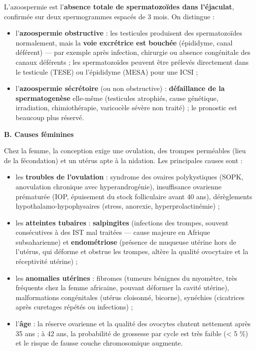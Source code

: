 \documentclass[11pt]{article}
\newcommand{\cle}[1]{{\popxbold\color{popdark}#1}}
\begin{document}
\begin{definition}[Azoospermie]
L'\cle{azoospermie} est l'\textbf{absence totale de spermatozoïdes dans l'éjaculat}, confirmée sur deux spermogrammes espacés de 3 mois. On distingue :
\begin{itemize}
\item l'\textbf{azoospermie obstructive} : les testicules produisent des spermatozoïdes normalement, mais la \textbf{voie excrétrice est bouchée} (épididyme, canal déférent) — par exemple après infection, chirurgie ou absence congénitale des canaux déférents ; les spermatozoïdes peuvent être prélevés directement dans le testicule (TESE) ou l'épididyme (MESA) pour une ICSI ;
\item l'\textbf{azoospermie sécrétoire} (ou non obstructive) : \textbf{défaillance de la spermatogenèse} elle-même (testicules atrophiés, cause génétique, irradiation, chimiothérapie, varicocèle sévère non traité) ; le pronostic est beaucoup plus réservé.
\end{itemize}
\end{definition}

\textbf{B. Causes féminines}\par

Chez la femme, la conception exige une ovulation, des trompes perméables (lieu de la fécondation) et un utérus apte à la nidation. Les principales causes sont :

\begin{itemize}
\item les \textbf{troubles de l'ovulation} : syndrome des ovaires polykystiques (\cle{SOPK}, anovulation chronique avec hyperandrogénie), insuffisance ovarienne prématurée (\cle{IOP}, épuisement du stock folliculaire avant 40 ans), dérèglements hypothalamo-hypophysaires (stress, anorexie, hyperprolactinémie) ;
\item les \textbf{atteintes tubaires} : \textbf{salpingites} (infections des trompes, souvent consécutives à des IST mal traitées — cause majeure en Afrique subsaharienne) et \textbf{endométriose} (présence de muqueuse utérine hors de l'utérus, qui déforme et obstrue les trompes, altère la qualité ovocytaire et la réceptivité utérine) ;
\item les \textbf{anomalies utérines} : fibromes (tumeurs bénignes du myomètre, très fréquents chez la femme africaine, pouvant déformer la cavité utérine), malformations congénitales (utérus cloisonné, bicorne), synéchies (cicatrices après curetages répétés ou infections) ;
\item l'\textbf{âge} : la réserve ovarienne et la qualité des ovocytes chutent nettement après 35 ans ; à 42 ans, la probabilité de grossesse par cycle est très faible (< 5 \%) et le risque de fausse couche chromosomique augmente.
\end{itemize}
\end{document}
